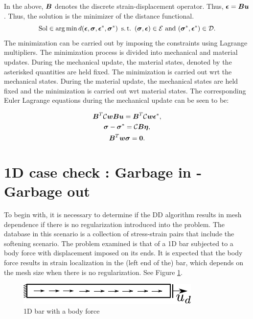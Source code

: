 \documentclass[12pt]{elsarticle}
\begin{document}
In the above, $\mbox{\boldmath $B$}$ denotes the discrete strain-displacement operator. Thus, $\mbox{\boldmath $\epsilon$} = \mbox{\boldmath $B$} \mbox{\boldmath $u$}$. Thus, the solution is the minimizer of the distance functional.
\begin{equation}
	\text{Sol} \in \arg \min d(\mbox{\boldmath $\epsilon$},\mbox{\boldmath $\sigma$},\mbox{\boldmath $\epsilon$}^*,\mbox{\boldmath $\sigma$}^*) \text{ } \operatorname{s.t.} \text{ } (\mbox{\boldmath $\sigma$} , \mbox{\boldmath $\epsilon$}) \in  \mathcal{E} \text{ and } (\mbox{\boldmath $\sigma$}^* , \mbox{\boldmath $\epsilon$}^*) \in  \mathcal{D}.
\end{equation}
The minimization can be carried out by imposing the constraints using Lagrange multipliers. The minimization process is divided into mechanical and material updates. During the mechanical update, the material states, denoted by the asterisked quantities are held fixed. The minimization is carried out wrt the mechanical states. During the material update, the mechanical states are held fixed and the minimization is carried out wrt material states.
The corresponding Euler Lagrange equations during the mechanical update can be seen to be:

\begin{gather}
	\mbox{\boldmath $B$}^T \mathcal{C}\mbox{\boldmath $w$} \mbox{\boldmath $B$} \mbox{\boldmath $u$} = \mbox{\boldmath $B$}^T \mathcal{C}\mbox{\boldmath $w$} \mbox{\boldmath $\epsilon$}^*, \\
	\mbox{\boldmath $\sigma$} - \mbox{\boldmath $\sigma$}^* =  \mathcal{C} \mbox{\boldmath $B$} \mbox{\boldmath $\eta$}, \\
	\mbox{\boldmath $B$}^T \mbox{\boldmath $w$}\mbox{\boldmath $\sigma$} = \mathbf{0}.
\end{gather}

\section{1D case check : Garbage in - Garbage out}
To begin with, it is necessary to determine if the DD algorithm results in mesh dependence if there is no regularization introduced into the problem. The database in this scenario is a collection of stress-strain pairs that include the softening scenario. The problem examined is that of a 1D bar subjected to a body force with displacement imposed on its ends. It is expected that the body force results in strain localization in the (left end of the) bar, which depends on the mesh size when there is no regularization. See Figure \ref{1D_bar_bf}.

\begin{figure}
	\centering
	\includegraphics[width=0.5\linewidth]{Images/1D_bar_bf.pdf}
	\caption{1D bar with a body force \label{1D_bar_bf}}
\end{figure}
\end{document}
